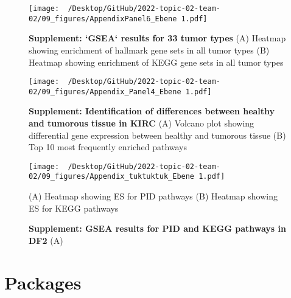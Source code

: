 \documentclass[
  parskip,
  openany]{scrreprt}
\begin{document}
\begin{figure}[h]
  \texttt{[image: ~/Desktop/GitHub/2022-topic-02-team-02/09\_figures/AppendixPanel6\_Ebene 1.pdf]}
  \caption{\textbf{Supplement: `GSEA` results for 33 tumor types} (A) Heatmap showing enrichment of hallmark gene sets in all tumor types (B) Heatmap showing enrichment of KEGG gene sets in all tumor types}
  \label{hmap}
\end{figure}

\begin{figure}[h]
 \begin{center}
   \texttt{[image: ~/Desktop/GitHub/2022-topic-02-team-02/09\_figures/Appendix\_Panel4\_Ebene 1.pdf]}
  \end{center}
  \caption{\textbf{Supplement: Identification of differences between healthy and tumorous tissue in KIRC } (A) Volcano plot showing differential gene expression between healthy and tumorous tissue (B) Top 10 most frequently enriched pathways}
  \label{volcanoap}
\end{figure}

\begin{figure}[h]
 \begin{center}
   \texttt{[image: ~/Desktop/GitHub/2022-topic-02-team-02/09\_figures/Appendix\_tuktuktuk\_Ebene 1.pdf]}
  \end{center}
  \caption{\textbf{Supplement: GSEA results for PID and KEGG pathways in DF2 } (A) } (A) Heatmap showing ES for PID pathways (B) Heatmap showing ES for KEGG pathways
  \label{tuk}
\end{figure}

\pagebreak

\hypertarget{packages-1}{%
\section{Packages}\label{packages-1}}
\end{document}
